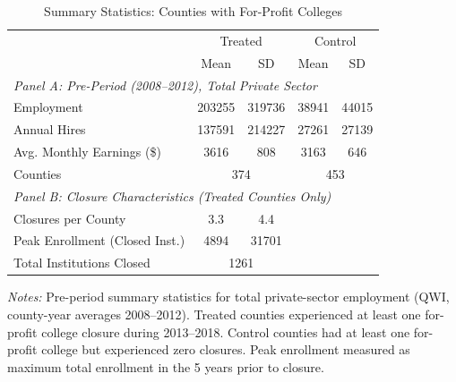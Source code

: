 \begin{table}[htbp]
\centering
\caption{Summary Statistics: Counties with For-Profit Colleges}
\label{tab:summary}
\begin{tabular}{lcccc}
\hline\hline
 & \multicolumn{2}{c}{Treated} & \multicolumn{2}{c}{Control} \\
 & Mean & SD & Mean & SD \\
\hline
\multicolumn{5}{l}{\textit{Panel A: Pre-Period (2008--2012), Total Private Sector}} \\[3pt]
Employment & 203255 & 319736 & 38941 & 44015 \\
Annual Hires & 137591 & 214227 & 27261 & 27139 \\
Avg. Monthly Earnings (\$) & 3616 & 808 & 3163 & 646 \\
Counties & \multicolumn{2}{c}{374} & \multicolumn{2}{c}{453} \\
[6pt]
\multicolumn{5}{l}{\textit{Panel B: Closure Characteristics (Treated Counties Only)}} \\[3pt]
Closures per County & 3.3 & 4.4 & & \\
Peak Enrollment (Closed Inst.) & 4894 & 31701 & & \\
Total Institutions Closed & \multicolumn{2}{c}{1261} & & \\
\hline\hline
\end{tabular}
\begin{tablenotes}[flushleft]\small
\item \textit{Notes:} Pre-period summary statistics for total private-sector employment
(QWI, county-year averages 2008--2012). Treated counties experienced at least one for-profit
college closure during 2013--2018. Control counties had at least one for-profit college but
experienced zero closures. Peak enrollment measured as maximum total enrollment in the 5 years
prior to closure.
\end{tablenotes}
\end{table}
